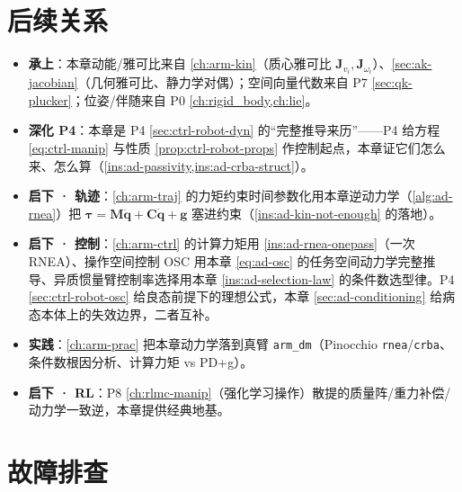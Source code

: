 \section{后续关系}
\label{sec:ad-relations}
\begin{itemize}
  \item \textbf{承上}：本章动能/雅可比来自 \cref{ch:arm-kin}（质心雅可比 $\mathbf{J}_{v_i},\mathbf{J}_{\omega_i}$）、\cref{sec:ak-jacobian}（几何雅可比、静力学对偶）；空间向量代数来自 P7 \cref{sec:qk-plucker}；位姿/伴随来自 P0 \cref{ch:rigid_body,ch:lie}。
  \item \textbf{深化 P4}：本章是 P4 \cref{sec:ctrl-robot-dyn} 的“完整推导来历”——P4 给方程 \cref{eq:ctrl-manip} 与性质 \cref{prop:ctrl-robot-props} 作控制起点，本章证它们怎么来、怎么算（\cref{ins:ad-passivity,ins:ad-crba-struct}）。
  \item \textbf{启下 · 轨迹}：\cref{ch:arm-traj} 的力矩约束时间参数化用本章逆动力学（\cref{alg:ad-rnea}）把 $\boldsymbol{\tau}=\mathbf{M}\ddot{\mathbf{q}}+\mathbf{C}\dot{\mathbf{q}}+\mathbf{g}$ 塞进约束（\cref{ins:ad-kin-not-enough} 的落地）。
  \item \textbf{启下 · 控制}：\cref{ch:arm-ctrl} 的计算力矩用 \cref{ins:ad-rnea-onepass}（一次 RNEA）、操作空间控制 OSC 用本章 \cref{eq:ad-osc} 的任务空间动力学完整推导、异质惯量臂控制率选择用本章 \cref{ins:ad-selection-law} 的条件数选型律。P4 \cref{sec:ctrl-robot-osc} 给良态前提下的理想公式，本章 \cref{sec:ad-conditioning} 给病态本体上的失效边界，二者互补。
  \item \textbf{实践}：\cref{ch:arm-prac} 把本章动力学落到真臂 \texttt{arm\_dm}（Pinocchio \texttt{rnea}/\allowbreak\texttt{crba}、条件数根因分析、计算力矩 vs PD+g）。
  \item \textbf{启下 · RL}：P8 \cref{ch:rlmc-manip}（强化学习操作）散提的质量阵/重力补偿/动力学一致逆，本章提供经典地基。
\end{itemize}

\section{故障排查}
\label{sec:ad-troubleshooting}


